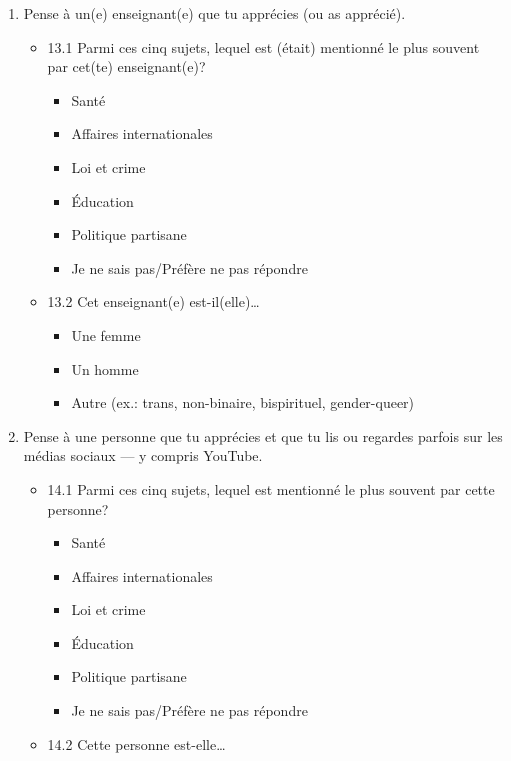 \documentclass[
  letterpaper,
  DIV=11,
  numbers=noendperiod]{scrreprt}
\providecommand{\tightlist}{%
  \setlength{\itemsep}{0pt}\setlength{\parskip}{0pt}}\usepackage{longtable,booktabs,array}
\begin{document}
\begin{enumerate}
\def\labelenumi{\arabic{enumi}.}
\setcounter{enumi}{12}
\item
  Pense à un(e) enseignant(e) que tu apprécies (ou as apprécié).

  \begin{itemize}
  \tightlist
  \item
    13.1 Parmi ces cinq sujets, lequel est (était) mentionné le plus
    souvent par cet(te) enseignant(e)?

    \begin{itemize}
    \tightlist
    \item
      Santé
    \item
      Affaires internationales
    \item
      Loi et crime
    \item
      Éducation
    \item
      Politique partisane
    \item
      Je ne sais pas/Préfère ne pas répondre
    \end{itemize}
  \item
    13.2 Cet enseignant(e) est-il(elle)\ldots{}

    \begin{itemize}
    \tightlist
    \item
      Une femme
    \item
      Un homme
    \item
      Autre (ex.: trans, non-binaire, bispirituel, gender-queer)
    \end{itemize}
  \end{itemize}
\item
  Pense à une personne que tu apprécies et que tu lis ou regardes
  parfois sur les médias sociaux --- y compris YouTube.

  \begin{itemize}
  \tightlist
  \item
    14.1 Parmi ces cinq sujets, lequel est mentionné le plus souvent par
    cette personne?

    \begin{itemize}
    \tightlist
    \item
      Santé
    \item
      Affaires internationales
    \item
      Loi et crime
    \item
      Éducation
    \item
      Politique partisane
    \item
      Je ne sais pas/Préfère ne pas répondre
    \end{itemize}
  \item
    14.2 Cette personne est-elle\ldots{}


\end{itemize}
\end{enumerate}
\end{document}
